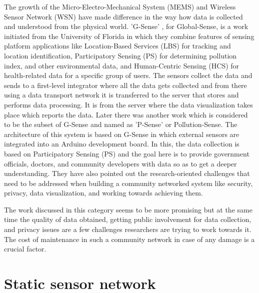 \par
The growth of the Micro-Electro-Mechanical System (MEMS) and Wireless Sensor Network (WSN) have made difference in the way how data is collected and understood from the physical world. 'G-Sense' \cite{Perez2010}, for Global-Sense, is a work initiated from the University of Florida in which they combine features of sensing platform applications like Location-Based Services (LBS) for tracking and location identification, Participatory Sensing (PS) for determining pollution index, and other environmental data, and Human-Centric Sensing (HCS) for health-related data for a specific group of users. The sensors collect the data and sends to a first-level integrator where all the data gets collected and from there using a data transport network it is transferred to the server that stores and performs data processing. It is from the server where the data visualization takes place which reports the data. Later there was another work which is considered to be the subset of G-Sense and named as 'P-Sense' \cite{Mendez2011} or Pollution-Sense. The architecture of this system is based on G-Sense in which external sensors are integrated into an Arduino development board. In this, the data collection is based on Participatory Sensing (PS) and the goal here is to provide government officials, doctors, and community developers with data so as to get a deeper understanding. They have also pointed out the research-oriented challenges that need to be addressed when building a community networked system like security, privacy, data visualization, and working towards achieving them. 

The work discussed in this category seems to be more promising but at the same time the quality of data obtained, getting public involvement for data collection, and privacy issues \cite{Yi2015} are a few challenges researchers are trying to work towards it. The cost of maintenance in such a community network in case of any damage is a crucial factor.



\section{Static sensor network}

